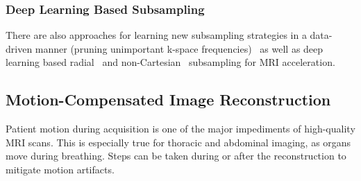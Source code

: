 \documentclass[english,version-2022-01]{uzl-thesis} %
\begin{document}
\subsubsection{Deep Learning Based Subsampling} \label{SubSubSec:DeepLearningBasedSubsampling}
There are also approaches for learning new subsampling strategies in a data-driven manner (pruning unimportant k-space frequencies)~\cite{MRISubsamplingPruning} as well as deep learning based radial~\cite{DeepMRIReconstructionRadialSubsampling} and non-Cartesian~\cite{DeepMRIReconstructionSubsampling} subsampling for MRI acceleration.


\subsection{Motion-Compensated Image Reconstruction} \label{SubSec:Motion-CompensatedReconstruction}
Patient motion during acquisition is one of the major impediments of high-quality MRI scans. This is especially true for thoracic and abdominal imaging, as organs move during breathing. Steps can be taken during or after the reconstruction to mitigate motion artifacts.
\end{document}
